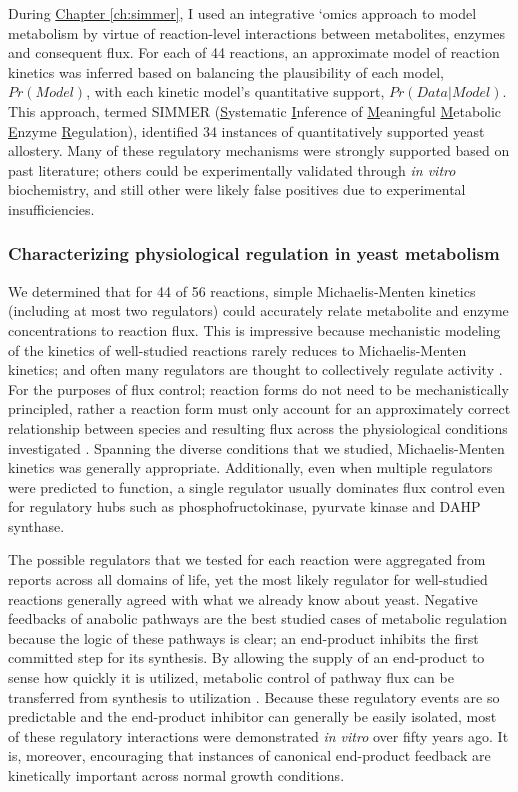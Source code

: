 During \hyperref[ch:simmer]{Chapter \ref{ch:simmer}}, I used an integrative `omics approach to model metabolism by virtue of reaction-level interactions between metabolites, enzymes and consequent flux. For each of 44 reactions, an approximate model of reaction kinetics was inferred based on balancing the plausibility of each model, $Pr(Model)$, with each kinetic model's quantitative support, $Pr(Data | Model)$. This approach, termed SIMMER (\underline{S}ystematic \underline{I}nference of \underline{M}eaningful \underline{M}etabolic \underline{E}nzyme \underline{R}egulation), identified 34 instances of quantitatively supported yeast allostery.  Many of these regulatory mechanisms were strongly supported based on past literature; others could be experimentally validated through \textit{in vitro} biochemistry, and still other were likely false positives due to experimental insufficiencies.

\subsubsection{Characterizing physiological regulation in yeast metabolism}

We determined that for 44 of 56 reactions, simple Michaelis-Menten kinetics (including at most two regulators) could accurately relate metabolite and enzyme concentrations to reaction flux. This is impressive because mechanistic modeling of the kinetics of well-studied reactions rarely reduces to Michaelis-Menten kinetics; and often many regulators are thought to collectively regulate activity \cite{Hill:1977vm}. For the purposes of flux control; reaction forms do not need to be mechanistically principled, rather a reaction form must only account for an approximately correct relationship between species and resulting flux across the physiological conditions investigated \cite{Fell:1997wg}. Spanning the diverse conditions that we studied, Michaelis-Menten kinetics was generally appropriate. Additionally, even when multiple regulators were predicted to function, a single regulator usually dominates flux control even for regulatory hubs such as phosphofructokinase, pyurvate kinase and DAHP synthase.  

The possible regulators that we tested for each reaction were aggregated from reports across all domains of life, yet the most likely regulator for well-studied reactions generally agreed with what we already know about yeast.  Negative feedbacks of anabolic pathways are the best studied cases of metabolic regulation because the logic of these pathways is clear; an end-product inhibits the first committed step for its synthesis.  By allowing the supply of an end-product to sense how quickly it is utilized, metabolic control of pathway flux can be transferred from synthesis to utilization \cite{CornishBowden:1995fy}. Because these regulatory events are so predictable and the end-product inhibitor can generally be easily isolated, most of these regulatory interactions were demonstrated \textit{in vitro} over fifty years ago. It is, moreover, encouraging that instances of canonical end-product feedback are kinetically important across normal growth conditions.

